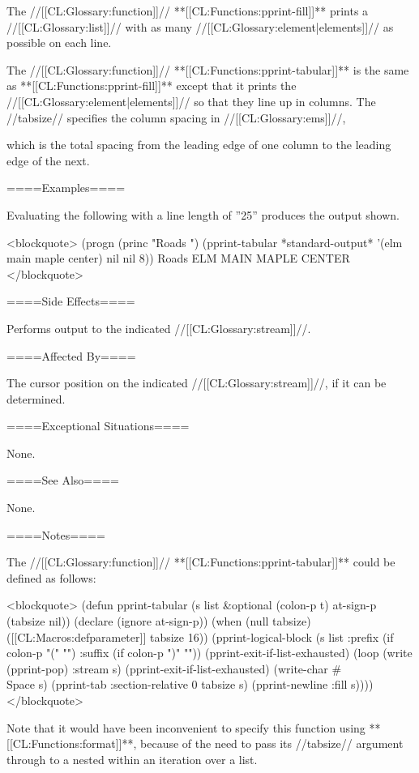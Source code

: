 \itemitem{\bull} The //[[CL:Glossary:function]]// **[[CL:Functions:pprint-fill]]** prints a //[[CL:Glossary:list]]// with as many //[[CL:Glossary:element|elements]]// as possible on each line.

\itemitem{\bull} The //[[CL:Glossary:function]]// **[[CL:Functions:pprint-tabular]]** is the same as **[[CL:Functions:pprint-fill]]** except that it prints the //[[CL:Glossary:element|elements]]// so that they line up in columns. The //tabsize// specifies the column spacing in //[[CL:Glossary:ems]]//,

which is the total spacing from the leading edge of one column to the leading edge of the next. \endlist

====Examples====

Evaluating the following with a line length of ''25'' produces the output shown.

<blockquote> (progn (princ "Roads ") (pprint-tabular *standard-output* '(elm main maple center) nil nil 8)) Roads ELM MAIN MAPLE CENTER </blockquote>

====Side Effects====

Performs output to the indicated //[[CL:Glossary:stream]]//.

====Affected By====

The cursor position on the indicated //[[CL:Glossary:stream]]//, if it can be determined.

====Exceptional Situations====

None.

====See Also====

None.

====Notes====

The //[[CL:Glossary:function]]// **[[CL:Functions:pprint-tabular]]** could be defined as follows:

<blockquote> (defun pprint-tabular (s list &optional (colon-p t) at-sign-p (tabsize nil)) (declare (ignore at-sign-p)) (when (null tabsize) ([[CL:Macros:defparameter]] tabsize 16)) (pprint-logical-block (s list :prefix (if colon-p "(" "") :suffix (if colon-p ")" "")) (pprint-exit-if-list-exhausted) (loop (write (pprint-pop) :stream s) (pprint-exit-if-list-exhausted) (write-char #\\Space s) (pprint-tab :section-relative 0 tabsize s) (pprint-newline :fill s)))) </blockquote>

Note that it would have been inconvenient to specify this function using **[[CL:Functions:format]]**, because of the need to pass its //tabsize// argument through to a  nested within an iteration over a list.

 
